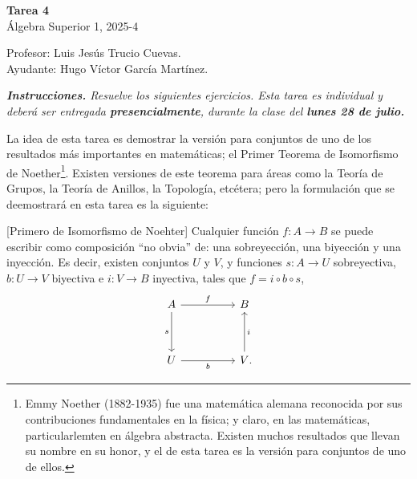 \documentclass[letterpaper,DIV=14,headsepline,12pt]{scrartcl}
\begin{document}
    \begin{center}
        {\fontsize{30}{60}\rmfamily \textbf{Tarea 4}} \\ \vspace{.2cm} Álgebra
        Superior 1, 2025-4
    \end{center}
    \begin{flushright}
        \footnotesize \hfill Profesor: Luis Jesús Trucio Cuevas.\\
        \hfill Ayudante: Hugo Víctor García Martínez.
    \end{flushright}

    \noindent\textit{\textbf{Instrucciones.} Resuelve los siguientes ejercicios.
    Esta tarea es individual y deberá ser entregada \textbf{presencialmente},
    durante la clase del \textbf{lunes 28 de julio.} \vspace{.4cm}}

    La idea de esta tarea es demostrar la versión para conjuntos de uno de los
    resultados más importantes en matemáticas; el Primer Teorema de Isomorfismo
    de Noether\footnote{Emmy Noether (1882-1935) fue una matemática alemana
    reconocida por sus contribuciones fundamentales en la física; y claro, en
    las matemáticas, particularlemten en álgebra abstracta. Existen muchos
    resultados que llevan su nombre en su honor, y el de esta tarea es la
    versión para conjuntos de uno de ellos.}. Existen versiones de este teorema
    para áreas como la Teoría de Grupos, la Teoría de Anillos, la Topología,
    etcétera; pero la formulación que se deemostrará en esta tarea es la
    siguiente:

    \begin{teorema}\label{teo:primero}[Primero de Isomorfismo de Noehter]
        Cualquier función $f\colon A \to B$ se puede escribir como composición ``no obvia''
        de: una sobreyección, una biyección y una inyección. Es decir, existen
        conjuntos $U$ y $V$, y funciones $s\colon A \to U$ sobreyectiva, $b\colon U \to V$
        biyectiva e $i\colon V \to B$ inyectiva, tales que $f = i \circ b \circ s$,
        \begin{equation}\label{eq:obj}
            \begin{tikzcd}
            A && B \\
            \\
            U && V\mathrlap{.}
            \arrow["f", from=1-1, to=1-3]
            \arrow["s"', from=1-1, to=3-1]
            \arrow["b"', from=3-1, to=3-3]
            \arrow["i"', from=3-3, to=1-3]
        \end{tikzcd}
        \end{equation}
    \end{teorema}
\end{document}
